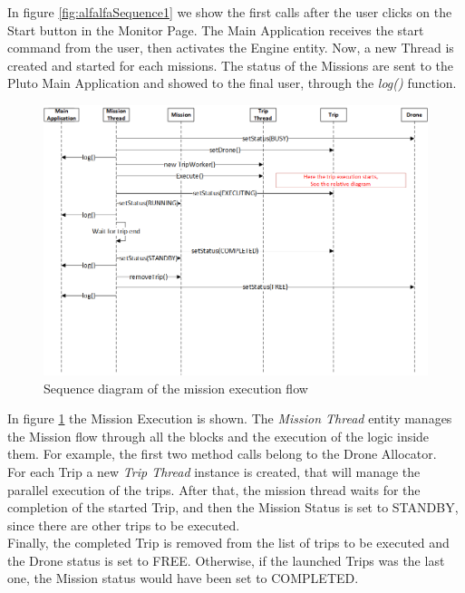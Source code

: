 In figure \ref{fig:alfalfaSequence1} we show the first calls after the user clicks on the Start button in the Monitor Page.
The Main Application receives the start command from the user, then activates the Engine entity. Now, a new Thread is created and started for each missions. The status of the Missions are sent to the Pluto Main Application and showed to the final user, through the \textit{log()} function.
\\

\begin{figure}[h!]
  \centering
  \includegraphics[width=\linewidth]{pictures/Alfalfa_Sequence_MissionExecution.png}
  \caption{Sequence diagram of the mission execution flow}
  \label{fig:alfalfaSequence2}
\end{figure}

In figure \ref{fig:alfalfaSequence2} the Mission Execution is shown.
The \textit{Mission Thread} entity manages the Mission flow through all the blocks and the execution of the logic inside them.
For example, the first two method calls belong to the Drone Allocator.
\\
For each Trip a new \textit{Trip Thread} instance is created, that will manage the parallel execution of the trips.
After that, the mission thread waits for the completion of the started Trip, and then the Mission Status is set to STANDBY, since there are other trips to be executed.
\\
Finally, the completed Trip is removed from the list of trips to be executed and the Drone status is set to FREE.
Otherwise, if the launched Trips was the last one, the Mission status would have been set to COMPLETED.
\\

